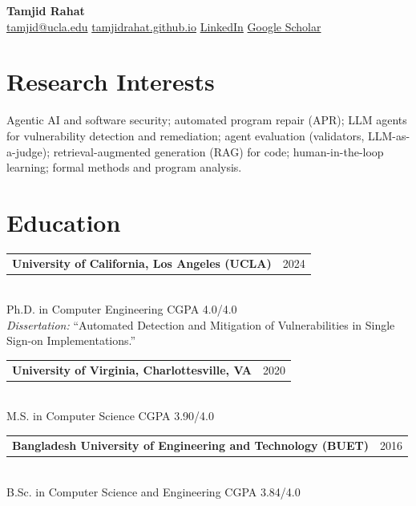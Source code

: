\documentclass[11pt,letterpaper]{article}
\makeatletter
\newcommand{\cvhead}[2]{%
  \begin{tabular*}{\linewidth}{@{}l@{\extracolsep{\fill}}r@{}}%
    \textbf{#1} & {\small\color{muted}#2}%
  \end{tabular*}\\[2pt]}
\makeatother
\begin{document}
\pagestyle{empty}

\begin{center}
  {\fontsize{28}{32}\selectfont\bfseries Tamjid Rahat}\\[8pt]
  \normalsize
  \href{mailto:tamjid@ucla.edu}{tamjid@ucla.edu}\quad\textbullet\quad
  \href{https://tamjidrahat.github.io}{tamjidrahat.github.io}\quad\textbullet\quad
  \href{https://www.linkedin.com/in/tamjidrahat}{LinkedIn}\quad\textbullet\quad
  \href{https://scholar.google.com/citations?user=LY1s3bsAAAAJ\&hl=en}{Google Scholar}
\end{center}

\section{Research Interests}
Agentic AI and software security; automated program repair (APR); LLM agents for
vulnerability detection and remediation; agent evaluation (validators, LLM-as-a-judge);
retrieval-augmented generation (RAG) for code; human-in-the-loop learning; formal methods
and program analysis.

\section{Education}
\cvhead{University of California, Los Angeles (UCLA)}{2024}%
Ph.D. in Computer Engineering \quad\textbullet\quad CGPA 4.0/4.0\\[1pt]
\textit{Dissertation:} ``Automated Detection and Mitigation of Vulnerabilities in
Single Sign-on Implementations.''

\cvhead{University of Virginia, Charlottesville, VA}{2020}%
M.S. in Computer Science \quad\textbullet\quad CGPA 3.90/4.0

\cvhead{Bangladesh University of Engineering and Technology (BUET)}{2016}%
B.Sc. in Computer Science and Engineering \quad\textbullet\quad CGPA 3.84/4.0

\end{document}
